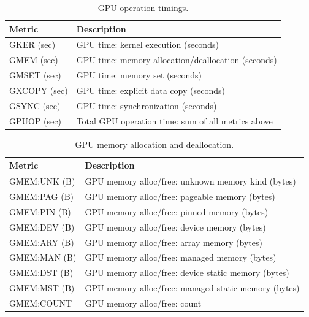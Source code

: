 \begin{table}[t]
\centering
\begin{tabular}{|l|l|}\hline
Metric & Description\\\hline\hline
 GKER (sec)  &  GPU time: kernel execution (seconds)  \\\hline
  GMEM (sec)  &  GPU time: memory allocation/deallocation (seconds)  \\\hline
  GMSET (sec)  &  GPU time: memory set (seconds)  \\\hline
  GXCOPY (sec)  &  GPU time: explicit data copy (seconds)  \\\hline
  GSYNC (sec)  &  GPU time: synchronization (seconds)  \\\hline
 GPUOP (sec) & Total GPU operation time: sum of all metrics above \\\hline
\end{tabular}
\caption{GPU operation timings.}
\label{table:gtimes}
\end{table}

\begin{table}[t]
\centering
\begin{tabular}{|l|l|}\hline
Metric & Description\\\hline\hline
 GMEM:UNK (B)  &  GPU memory alloc/free: unknown memory kind (bytes)  \\\hline
  GMEM:PAG (B)  &  GPU memory alloc/free: pageable memory (bytes)  \\\hline
  GMEM:PIN (B)  &  GPU memory alloc/free: pinned memory (bytes)  \\\hline
  GMEM:DEV (B)  &  GPU memory alloc/free: device memory (bytes)  \\\hline
  GMEM:ARY (B)  &  GPU memory alloc/free: array memory (bytes)  \\\hline
  GMEM:MAN (B)  &  GPU memory alloc/free: managed memory (bytes)  \\\hline
  GMEM:DST (B)  &  GPU memory alloc/free: device static memory (bytes)  \\\hline
  GMEM:MST (B)  &  GPU memory alloc/free: managed static memory (bytes)  \\\hline
  GMEM:COUNT  &  GPU memory alloc/free: count  \\\hline
\end{tabular}
\caption{GPU memory allocation and deallocation.}
\label{table:gmem}
\end{table}


